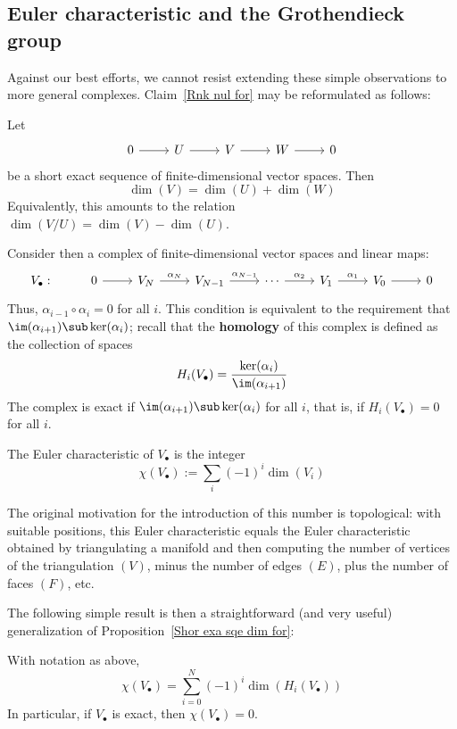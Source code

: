 \subsection{Euler characteristic and the Grothendieck group}
Against our best efforts, we cannot resist extending these simple observations to more general complexes. Claim~\ref{Rnk nul for} may be reformulated as follows:
\begin{proposition}\label{Shor exa sqe dim for}
Let
\[\begin{tikzcd}
0\ar[r]&U\ar[r]&V\ar[r]&W\ar[r]&0
\end{tikzcd}\]
be a short exact sequence of finite-dimensional vector spaces. Then
\[\dim(V)=\dim(U)+\dim(W)\]
Equivalently, this amounts to the relation $\dim(V/U)=\dim(V)-\dim(U)$.
\end{proposition}
Consider then a complex of finite-dimensional vector spaces and linear maps:
\[\begin{tikzcd}
V_{\bullet}:& 0\ar[r]&V_N\ar[r,"\alpha_N"]&V_{N-1}\ar[r,"\alpha_{N-1}"]&\cdots\ar[r,"\alpha_2"]&V_1\ar[r,"\alpha_1"]&V_0\ar[r]&0
\end{tikzcd}\]
Thus, $\alpha_{i-1}\circ\alpha_i=0$ for all $i$. This condition is equivalent to the requirement that $\im(\alpha_{i+1})\sub\ker(\alpha_i)$; recall that the \textbf{homology} of this complex is defined as the collection of spaces
\[H_i(V_{\bullet})=\dfrac{\ker(\alpha_i)}{\im(\alpha_{i+1})}\]
The complex is exact if $\im(\alpha_{i+1})\sub\ker(\alpha_i)$ for all $i$, that is, if $H_i(V_{\bullet})=0$ for all $i$.
\begin{definition}
The Euler characteristic of $V_{\bullet}$ is the integer
\[\chi(V_{\bullet}):=\sum_{i}(-1)^i\dim(V_i)\]
\end{definition}
The original motivation for the introduction of this number is topological: with suitable positions, this Euler characteristic equals the Euler characteristic obtained by triangulating a manifold and then computing the number of vertices of the triangulation $(V)$, minus the number of edges $(E)$, plus the number of faces $(F)$, etc.\par
The following simple result is then a straightforward (and very useful) generalization of Proposition~\ref{Shor exa sqe dim for}:
\begin{proposition}\label{Eular char homo for}
With notation as above,
\[\chi(V_{\bullet})=\sum_{i=0}^{N}(-1)^i\dim(H_i(V_{\bullet}))\]
In particular, if $V_{\bullet}$ is exact, then $\chi(V_{\bullet})=0$.
\end{proposition}
